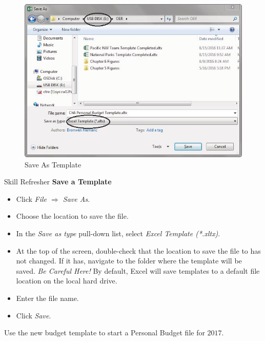 \begin{figure}[H]
	\centering
	\includegraphics[width=\maxwidth{.95\linewidth}]{gfx/ch06_fig11}
	\caption{Save As Template}
	\label{06:fig11}
\end{figure}

\begin{center}
	\begin{sklbox}{Skill Refresher}
		\textbf{Save a Template}
		\\
		\begin{itemize}
			\setlength{\itemsep}{0pt}
			\setlength{\parskip}{0pt}
			\setlength{\parsep}{0pt}

			\item Click \textit{File $ \Rightarrow $ Save As}.
			\item Choose the location to save the file.
			\item In the \textit{Save as type} pull-down list, select \textit{Excel Template (*.xltx)}.
			\item At the top of the screen, double-check that the location to save the file to has not changed. If it has, navigate to the folder where the template will be saved. \textit{Be Careful Here!} By default, Excel will save templates to a default file location on the local hard drive.
			\item Enter the file name.
			\item Click \textit{Save}.
			
		\end{itemize}
	\end{sklbox}
\end{center}

Use the new budget template to start a Personal Budget file for $ 2017 $. 

